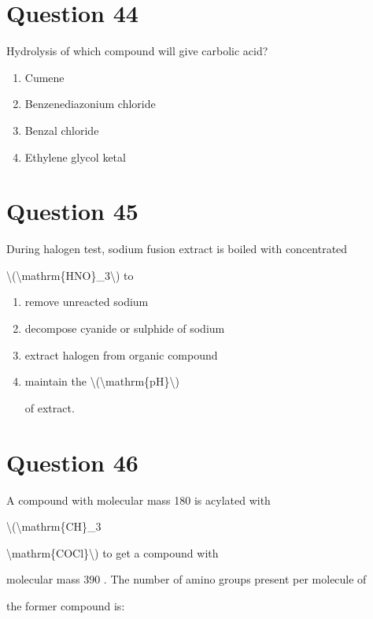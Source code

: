 \documentclass{article}
\begin{document}
\section*{Question 44}
Hydrolysis of which compound will give carbolic acid?


\begin{enumerate}[label=(\alph*)]
\item Cumene


\item Benzenediazonium chloride


\item Benzal chloride


\item Ethylene glycol ketal


\end{enumerate}
\newpage
\section*{Question 45}
During halogen test, sodium fusion extract is boiled with concentrated

\textbackslash(\textbackslash mathrm\{HNO\}\_3\textbackslash) to


\begin{enumerate}[label=(\alph*)]
\item remove unreacted sodium


\item decompose cyanide or sulphide of sodium


\item extract halogen from organic compound


\item maintain the \textbackslash(\textbackslash mathrm\{pH\}\textbackslash)

of extract.


\end{enumerate}
\newpage
\section*{Question 46}
A compound with molecular mass 180 is acylated with

\textbackslash(\textbackslash mathrm\{CH\}\_3

\textbackslash mathrm\{COCl\}\textbackslash) to get a compound with

molecular mass 390 . The number of amino groups present per molecule of

the former compound is:
\end{document}
